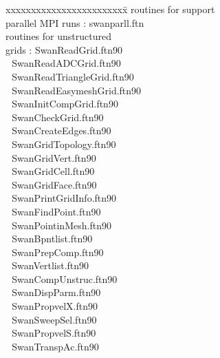 \documentclass[12pt]{book}
\begin{document}
\begin{tabbing}
xxxxxxxxxxxxxxxxxxxxxxxx\= \kill
routines for support     \> \\
parallel MPI runs        \>:       swanparll.ftn \\
routines for unstructured \> $\,\,$ \\
grids                     \>:       SwanReadGrid.ftn90 \\
                          \> $\,\,$ SwanReadADCGrid.ftn90 \\
                          \> $\,\,$ SwanReadTriangleGrid.ftn90 \\
                          \> $\,\,$ SwanReadEasymeshGrid.ftn90 \\
                          \> $\,\,$ SwanInitCompGrid.ftn90 \\
                          \> $\,\,$ SwanCheckGrid.ftn90 \\
                          \> $\,\,$ SwanCreateEdges.ftn90 \\
                          \> $\,\,$ SwanGridTopology.ftn90 \\
                          \> $\,\,$ SwanGridVert.ftn90 \\
                          \> $\,\,$ SwanGridCell.ftn90 \\
                          \> $\,\,$ SwanGridFace.ftn90 \\
                          \> $\,\,$ SwanPrintGridInfo.ftn90 \\
                          \> $\,\,$ SwanFindPoint.ftn90 \\
                          \> $\,\,$ SwanPointinMesh.ftn90 \\
                          \> $\,\,$ SwanBpntlist.ftn90 \\
                          \> $\,\,$ SwanPrepComp.ftn90 \\
                          \> $\,\,$ SwanVertlist.ftn90 \\
                          \> $\,\,$ SwanCompUnstruc.ftn90 \\
                          \> $\,\,$ SwanDispParm.ftn90 \\
                          \> $\,\,$ SwanPropvelX.ftn90 \\
                          \> $\,\,$ SwanSweepSel.ftn90 \\
                          \> $\,\,$ SwanPropvelS.ftn90 \\
                          \> $\,\,$ SwanTranspAc.ftn90 \\

\end{tabbing}
\end{document}
